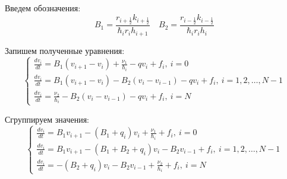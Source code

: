 Введем обозначения:
\[
  B_1 =\frac{r_{i + \frac{1}{2}} k_{i + \frac{1}{2}}}{\hbar_i r_i h_{i + 1}} 
  \quad B_2 = \frac{r_{i - \frac{1}{2}} k_{i - \frac{1}{2}}}{\hbar_i r_i h_{i}}
\]

Запишем полученные уравнения:
\[
  \begin{cases}
    \frac{d v_i}{dt} = B_1 (v_{i+1}-v_i)
    + \frac{\nu_1}{\hbar_i} - q v_i + f_i,\ i = 0 \\

    \frac{d v_i}{dt} = B_1 (v_{i+1}-v_i)
    - B_2 (v_{i}-v_{i-1}) - q v_i + f_i,\ i = 1, 2, \dots, N-1 \\

    \frac{d v_i}{dt} = \frac{\nu_2}{\hbar_i}
  - B_2 (v_{i}-v_{i-1}) - q v_i + f_i,\ i = N
  \end{cases}
\]

Сгруппируем значения:
\[
  \begin{cases}
    \frac{d v_i}{dt} = B_1 v_{i+1} - (B_1 + q_i) v_i + \frac{\nu_1}{\hbar_i} + f_i,\ i=0 \\
    \frac{d v_i}{dt} = B_1 v_{i+1} - (B_1 + B_2 + q_i) v_i - B_2 v_{i - 1} + f_i,\ i = 1, 2,\dots, N-1\\
    \frac{d v_i}{dt} = -(B_2 + q_i)v_i - B_2 v_{i - 1} + \frac{\nu_2}{\hbar_i} + f_i,\ i = N
  \end{cases}
\]

